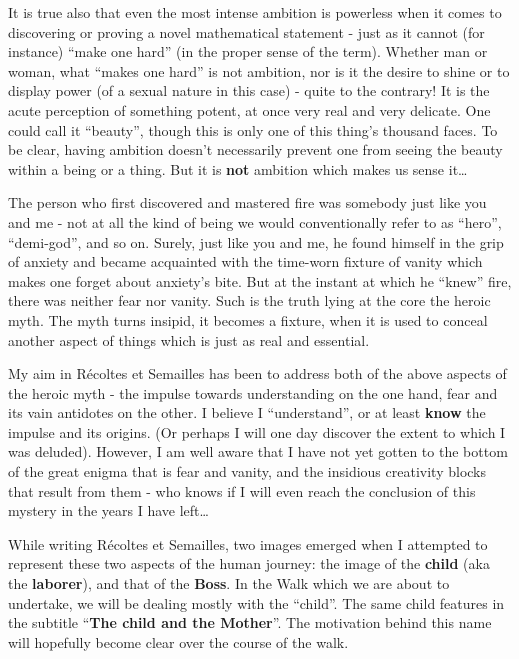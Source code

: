 It is true also that even the most intense ambition is
powerless when it comes to discovering or proving a novel mathematical statement - just as it cannot (for instance) ``make one hard'' (in the proper sense of the term).
Whether man or woman, what ``makes one hard'' is not ambition, nor is it the desire to shine or to
display power (of a sexual nature in this case) - quite to the contrary!
It is the acute perception of something potent, at once very real and very delicate. 
One could call it ``beauty'', though this is only one of
this thing's thousand faces. To be clear, having ambition doesn't necessarily prevent one from seeing the beauty within a being or a thing. But it is \textbf{not} ambition which makes us
sense it\ldots 

The person who first discovered and mastered fire was somebody just like you and me -
not at all the kind of being we would conventionally refer to as ``hero'', ``demi-god'', and so on.  
Surely, just like you and me, he found himself in the grip of anxiety and became acquainted with the time-worn fixture of vanity which makes one forget about anxiety's bite.
But at the instant at which he ``knew'' fire, there was neither fear nor vanity. 
Such is the truth lying at the core the heroic myth.
The myth turns insipid, it becomes a fixture, when it is used
to conceal another aspect of things which is just as real and essential. 

My aim in R\'ecoltes et Semailles has been to address both of the above aspects of the heroic myth - 
the impulse towards understanding on the one hand, fear and its vain antidotes on the other. 
I believe I ``understand'', or at least \textbf{know} the impulse and its origins. (Or
perhaps I will one day discover the extent to which I was deluded).  
However, I am well aware that I have not yet gotten to the bottom of the great enigma that is fear and vanity, 
and the insidious creativity blocks that result from them - 
who knows if I will even reach the conclusion of this mystery in the years I have
left\ldots

While writing
R\'ecoltes et Semailles, 
two images emerged when I attempted to represent these two aspects of the human journey:
the image of the \textbf{child} (aka the \textbf{laborer}), and that of the
\textbf{Boss}.
In the Walk which we are about to undertake, we will be dealing mostly with the ``child''.
The same child features in the subtitle ``\textbf{The child and the Mother}''. 
The motivation behind this name 
will hopefully become clear over the course of the walk.

